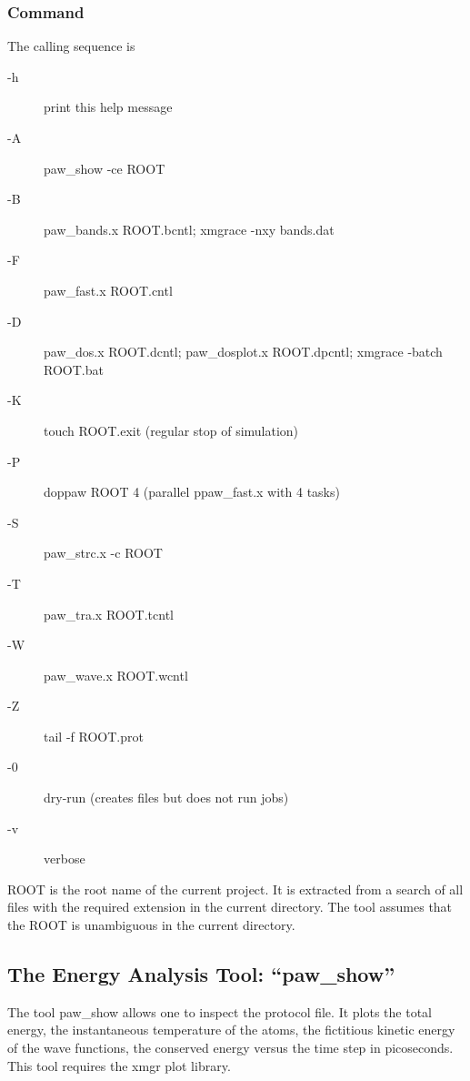 \documentclass[final,12pt,makeidx,DIV=calc]{article}
\begin{document}
{{{%
\subsubsection{Command}

The calling sequence is

\bigskip{}\bigskip

\begin{description}
\item[-h] print this help message
\item[-A] paw\_show -ce ROOT
\item[-B] paw\_bands.x ROOT.bcntl; xmgrace -nxy bands.dat
\item[-F] paw\_fast.x ROOT.cntl 
\item[-D] paw\_dos.x ROOT.dcntl; paw\_dosplot.x ROOT.dpcntl; 
  xmgrace -batch ROOT.bat
\item[-K] touch ROOT.exit (regular stop of simulation)
\item[-P] doppaw ROOT 4 (parallel ppaw\_fast.x with 4 tasks)
\item[-S] paw\_strc.x -c ROOT
\item[-T] paw\_tra.x ROOT.tcntl
\item[-W] paw\_wave.x ROOT.wcntl
\item[-Z] tail -f ROOT.prot
\item[-0] dry-run (creates files but does not run jobs)
\item[-v] verbose
\end{description}

ROOT is the root name of the current project. It is extracted from a
search of all files with the required extension in the current
directory.  The tool assumes that the ROOT is unambiguous in the
current directory.

\subsection{The Energy Analysis Tool: ``paw\_show''}
\label{sec:pawshow}
The tool paw\_show allows one to inspect the protocol file. It plots the
total energy, the instantaneous temperature of the atoms, the
fictitious kinetic energy of the wave functions, the conserved energy
versus the time step in picoseconds. This tool requires the xmgr plot
library\cite{xmgrace}.

}}}
\end{document}
